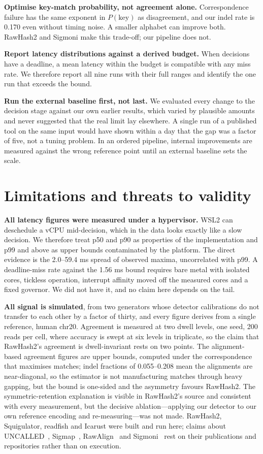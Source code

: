 \documentclass[conference]{IEEEtran}
\begin{document}
\textbf{Optimise key-match probability, not agreement alone.} Correspondence failure has the
same exponent in $P(\mathrm{key})$ as disagreement, and our indel rate is 0.170 even without
timing noise. A smaller alphabet can improve both. RawHash2 and Sigmoni make this trade-off; our
pipeline does not.

\textbf{Report latency distributions against a derived budget.} When decisions have a deadline, a
mean latency within the budget is compatible with any miss rate. We therefore report all nine
runs with their full ranges and identify the one run that exceeds the bound.

\textbf{Run the external baseline first, not last.} We evaluated every change to the decision
stage against our own earlier results, which varied by plausible amounts and never suggested
that the real limit lay elsewhere. A single run of a published tool on the same input
would have shown within a day that the gap was a factor of five, not a tuning problem. In an
ordered pipeline, internal improvements are measured against the wrong reference point until an
external baseline sets the scale.

\section{Limitations and threats to validity}
\label{sec:limits}

\textbf{All latency figures were measured under a hypervisor.} WSL2 can deschedule a vCPU
mid-decision, which in the data looks exactly like a slow decision. We therefore treat p50 and
p90 as properties of the implementation and p99 and above as upper bounds contaminated by the
platform. The direct evidence is the 2.0--59.4 ms spread of observed maxima, uncorrelated with
p99. A deadline-miss rate against the 1.56 ms bound requires bare metal with isolated
cores, tickless operation, interrupt affinity moved off the measured cores and a fixed
governor. We did not have it, and no claim here depends on the tail.

\textbf{All signal is simulated}, from two generators whose detector calibrations do not
transfer to each other by a factor of thirty, and every figure derives from a single
reference, human chr20. Agreement is measured at two dwell levels, one seed, 200 reads per
cell, where accuracy is swept at six levels in triplicate, so the claim that RawHash2's
agreement is dwell-invariant rests on two points. The alignment-based agreement figures are
upper bounds, computed under the correspondence that maximises matches; indel fractions of
0.055--0.208 mean the alignments are near-diagonal, so the estimator is not manufacturing
matches through heavy gapping, but the bound is one-sided and the asymmetry favours RawHash2.
The symmetric-retention explanation is visible in RawHash2's source and consistent with every
measurement, but the decisive ablation---applying our detector to our own reference encoding
and re-measuring---was not made. RawHash2, Squigulator, readfish and Icarust were built and
run here; claims about UNCALLED~\cite{uncalled}, Sigmap~\cite{sigmap},
RawAlign~\cite{rawalign} and Sigmoni~\cite{sigmoni} rest on their publications and
repositories rather than on execution.
\end{document}
